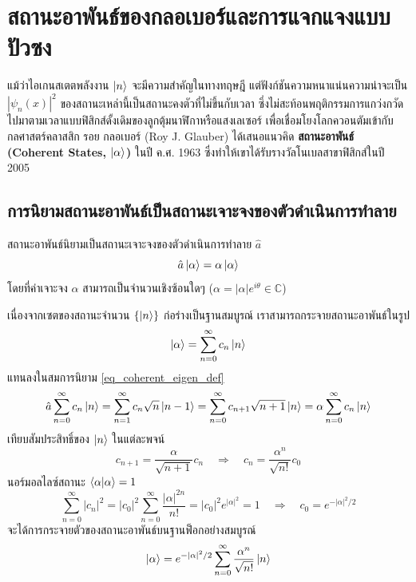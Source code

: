 \section{สถานะอาพันธ์ของกลอเบอร์และการแจกแจงแบบปัวซง}
\label{sec_coherent_states}

แม้ว่าไอเกนสเตตพลังงาน $\ket{n}$ จะมีความสำคัญในทางทฤษฎี แต่ฟังก์ชันความหนาแน่นความน่าจะเป็น $|\psi_n(x)|^2$ ของสถานะเหล่านี้เป็นสถานะคงตัวที่ไม่ขึ้นกับเวลา ซึ่งไม่สะท้อนพฤติกรรมการแกว่งกวัดไปมาตามเวลาแบบฟิสิกส์ดั้งเดิมของลูกตุ้มนาฬิกาหรือแสงเลเซอร์ เพื่อเชื่อมโยงโลกควอนตัมเข้ากับกลศาสตร์คลาสสิก รอย กลอเบอร์ (Roy J. Glauber) ได้เสนอแนวคิด \textbf{สถานะอาพันธ์ (Coherent States, $\ket{\alpha}$)} ในปี ค.ศ. 1963 ซึ่งทำให้เขาได้รับรางวัลโนเบลสาขาฟิสิกส์ในปี 2005

\subsection{การนิยามสถานะอาพันธ์เป็นสถานะเจาะจงของตัวดำเนินการทำลาย}
สถานะอาพันธ์นิยามเป็นสถานะเจาะจงของตัวดำเนินการทำลาย $\hat{a}$
\begin{equation}
\hat{a}\ket{\alpha} = \alpha\ket{\alpha} \label{eq_coherent_eigen_def}
\end{equation}
โดยที่ค่าเจาะจง $\alpha$ สามารถเป็นจำนวนเชิงซ้อนใดๆ ($\alpha = |\alpha|e^{i\theta} \in \mathbb{C}$)

เนื่องจากเซตของสถานะจำนวน $\{\ket{n}\}$ ก่อร่างเป็นฐานสมบูรณ์ เราสามารถกระจายสถานะอาพันธ์ในรูป
\begin{equation}
\ket{\alpha} = \sum_{n=0}^\infty c_n \ket{n}
\end{equation}
แทนลงในสมการนิยาม \eqref{eq_coherent_eigen_def}
\begin{equation}
\hat{a}\sum_{n=0}^\infty c_n \ket{n} = \sum_{n=1}^\infty c_n \sqrt{n}\ket{n - 1} = \sum_{n=0}^\infty c_{n+1}\sqrt{n + 1}\ket{n} = \alpha\sum_{n=0}^\infty c_n \ket{n}
\end{equation}
เทียบสัมประสิทธิ์ของ $\ket{n}$ ในแต่ละพจน์
\begin{equation}
c_{n+1} = \frac{\alpha}{\sqrt{n + 1}} c_n \quad \Longrightarrow \quad c_n = \frac{\alpha^n}{\sqrt{n!}} c_0
\end{equation}
นอร์มอลไลซ์สถานะ $\braket{\alpha}{\alpha} = 1$
\begin{equation}
\sum_{n=0}^\infty |c_n|^2 = |c_0|^2 \sum_{n=0}^\infty \frac{|\alpha|^{2n}}{n!} = |c_0|^2 e^{|\alpha|^2} = 1 \quad \Longrightarrow \quad c_0 = e^{-|\alpha|^2/2}
\end{equation}
จะได้การกระจายตัวของสถานะอาพันธ์บนฐานฟ็อกอย่างสมบูรณ์
\begin{equation}
\ket{\alpha} = e^{-|\alpha|^2/2} \sum_{n=0}^\infty \frac{\alpha^n}{\sqrt{n!}} \ket{n} \label{eq_coherent_fock_expansion}
\end{equation}

